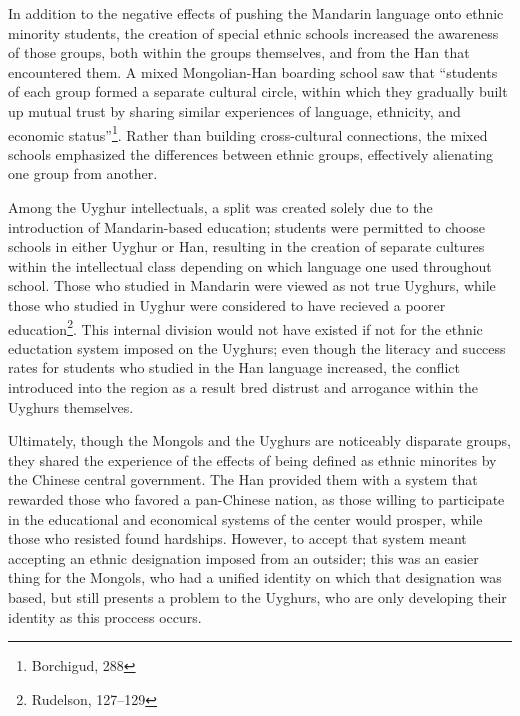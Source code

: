 In addition to the negative effects of pushing the Mandarin
language onto ethnic
minority students, the creation of special ethnic schools increased the
awareness of those groups, both within the groups themselves, and from the Han
that encountered them. A mixed Mongolian-Han boarding school saw that ``students
of each group formed a separate cultural circle, within which they
gradually built up mutual trust by sharing similar experiences of language,
ethnicity, and economic status''\footnote{Borchigud, 288}. Rather than building
cross-cultural connections, the mixed schools emphasized the differences between
ethnic groups, effectively alienating one group from another.

Among the Uyghur intellectuals, a split was created solely due to the
introduction of Mandarin-based education; students were permitted to choose
schools in either Uyghur or Han, resulting in the creation of separate cultures
within the intellectual class depending on which language one used throughout
school. Those who studied in Mandarin were viewed as not true Uyghurs, while
those who studied in Uyghur were considered to have recieved a poorer
education\footnote{Rudelson, 127--129}. This internal division would not have
existed if not for the ethnic eductation system imposed on the Uyghurs; even
though the literacy and success rates for students who studied in the Han
language increased, the conflict introduced into the region as a result bred
distrust and arrogance within the Uyghurs themselves.

Ultimately, though the Mongols and the Uyghurs are noticeably disparate groups,
they shared the experience of the effects of being defined as ethnic minorites
by the Chinese central government. The Han provided them with a system that
rewarded those who favored a pan-Chinese nation, as those willing to participate
in the educational and economical systems of the center would prosper, while
those who resisted found hardships. However, to accept that system meant
accepting an ethnic designation imposed from an outsider; this was an easier
thing for the Mongols, who had a unified identity on which that designation was
based, but still presents a problem to the Uyghurs, who are only developing
their identity as this proccess occurs.
